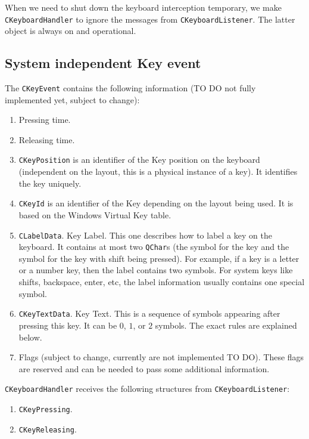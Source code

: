 \documentclass{article}
\begin{document}
When we need to shut down the keyboard interception temporary, we make \verb"CKeyboardHandler" to ignore the messages from \verb"CKeyboardListener". The latter object is always on and operational.

\subsection{System independent Key event}

The \verb"CKeyEvent" contains the following information (TO DO not fully implemented yet, subject to change):
\begin{enumerate}
\item Pressing time.

\item Releasing time.

\item \verb"CKeyPosition" is an identifier of the Key position on the keyboard (independent on the layout, this is a physical instance of a key). It identifies the key uniquely.

\item \verb"CKeyId" is an identifier of the Key depending on the layout being used. It is based on the Windows Virtual Key table.

\item \verb"CLabelData". Key Label. This one describes how to label a key on the keyboard. It contains at most two \verb"QChar"s (the symbol for the key and the symbol for the key with shift being pressed).  For example, if a key is a letter or a number key, then the label contains two symbols. For system keys like shifts, backspace, enter, etc, the label information usually contains one special symbol.

\item \verb"CKeyTextData". Key Text. This is a sequence of symbols appearing after pressing this key. It can be $0$, $1$, or $2$ symbols. The exact rules are explained below.

\item Flags (subject to change, currently are not implemented TO DO). These flags are reserved and can be needed to pass some additional information.
\end{enumerate}

\verb"CKeyboardHandler" receives the following structures from \verb"CKeyboardListener":
\begin{enumerate}
\item \verb"CKeyPressing".
\item \verb"CKeyReleasing".
\end{enumerate}
\end{document}
